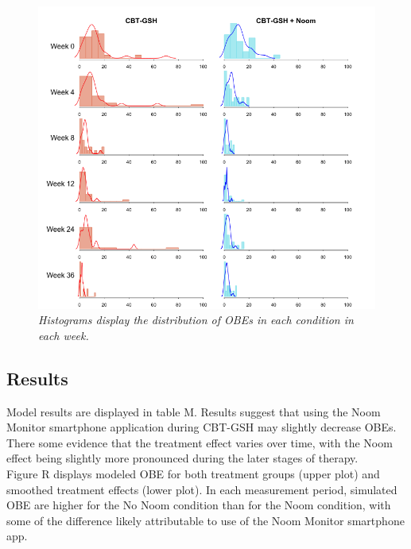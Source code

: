 \documentclass[12pt, oneside]{article}
\begin{document}
\begin{figure}[h]
\centering
\includegraphics[width=\textwidth, height=\textheight, keepaspectratio]{ppc_hist_dens.png}
\caption{\emph{Histograms display the distribution of OBEs in each condition in each week.}}
\end{figure}

\subsection{Results}
Model results are displayed in table M.  Results suggest that using the Noom Monitor smartphone application during CBT-GSH may slightly decrease OBEs.  There some evidence that the treatment effect varies over time, with the Noom effect being slightly more pronounced during the later stages of therapy.
\\

Figure R displays modeled OBE for both treatment groups (upper plot) and smoothed treatment effects (lower plot).  In each measurement period, simulated OBE are higher for the No Noom condition than for the Noom condition, with some of the difference likely attributable to use of the Noom Monitor smartphone app.  
\end{document}
